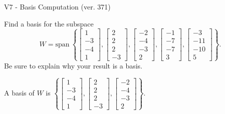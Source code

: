 \begin{exercise}
  \begin{exerciseTitle}V7 - Basis Computation (ver. 371)\end{exerciseTitle}
  \begin{exerciseStatement}
    Find a basis for the subspace 
\[W=\mathrm{span}\ \left\{\left[\begin{array}{r}
1 \\
-3 \\
-4 \\
1
\end{array}\right] , \left[\begin{array}{r}
2 \\
2 \\
2 \\
-3
\end{array}\right] , \left[\begin{array}{r}
-2 \\
-4 \\
-3 \\
2
\end{array}\right] , \left[\begin{array}{r}
-1 \\
-7 \\
-7 \\
3
\end{array}\right] , \left[\begin{array}{r}
-3 \\
-11 \\
-10 \\
5
\end{array}\right]\right\}.\]
 Be sure to explain why your result is a basis.


  \end{exerciseStatement}
  \begin{exerciseAnswer}
   A basis of \(W\) is  \(\left\{\left[\begin{array}{r}
1 \\
-3 \\
-4 \\
1
\end{array}\right] , \left[\begin{array}{r}
2 \\
2 \\
2 \\
-3
\end{array}\right] , \left[\begin{array}{r}
-2 \\
-4 \\
-3 \\
2
\end{array}\right]\right\}\).
  


  \end{exerciseAnswer}
\end{exercise}